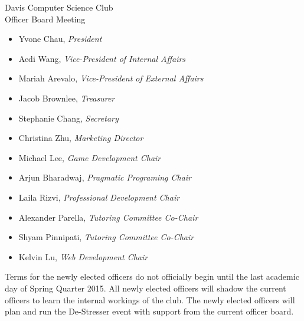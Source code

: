 \documentclass{article}
\begin{document}
\begin{Minutes}{Davis Computer Science Club\\Officer Board Meeting}

	






\maketitle

	
\begin{itemize}
	\item Yvone Chau, \textit{President}
	\item Aedi Wang, \textit{Vice-President of Internal Affairs}
	\item Mariah Arevalo, \textit{Vice-President of External Affairs}
	\item Jacob Brownlee, \textit{Treasurer}
	\item Stephanie Chang, \textit{Secretary}
	\item Christina Zhu, \textit{Marketing Director}
	\item Michael Lee, \textit{Game Development Chair}
	\item Arjun Bharadwaj, \textit{Pragmatic Programing Chair}
	\item Laila Rizvi, \textit{Professional Development Chair}
	\item Alexander Parella, \textit{Tutoring Committee Co-Chair}
	\item Shyam Pinnipati, \textit{Tutoring Committee Co-Chair}
	\item Kelvin Lu, \textit{Web Development Chair}
\end{itemize}	

Terms for the newly elected officers do not officially begin until the last academic day of Spring Quarter 2015. All newly elected officers will shadow the current officers to learn the internal workings of the club. The newly elected officers will plan and run the De-Stresser event with support from the current officer board.


\end{Minutes}
\end{document}
